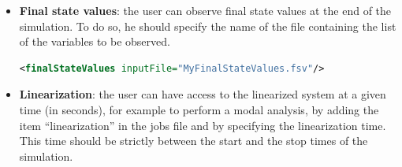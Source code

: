 \documentclass[a4paper, 12pt]{report}
\begin{document}
\begin{itemize}
HDF5 export requires \Dynawo to have been compiled with HDF5 support (CMake option \texttt{DYNAWO\_ACTIVATE\_HDF5\_EXPORT}, enabled by default).
If HDF5 support is not available and \texttt{exportMode="HDF5"} is requested, \Dynawo will raise an error at runtime.

Curves of every export mode, HDF5 included, are displayed in the NRT viewer by the \texttt{curves} command of 
(\texttt{curves-reference} compares them with the reference directory next to the jobs file):
\begin{lstlisting}[language=bash,numbers=none]
./envDynawo.sh curves path/to/simulation.jobs
\end{lstlisting}
Reading HDF5 curves requires the Python package \texttt{h5py}, listed with the other packages used by the viewer in :
\begin{lstlisting}[language=bash,numbers=none]
python -m pip install -r nrt/viewer/requirements.txt
\end{lstlisting}

\item \textbf{Final state values}: the user can observe final state values at the end of the simulation. To do so, he should specify the name of the file containing the list of the variables to be observed.

\begin{lstlisting}[language=XML, morekeywords={finalStateValues},numbers=none]
<finalStateValues inputFile="MyFinalStateValues.fsv"/>
\end{lstlisting}

\item \textbf{Linearization}: the user can have access to the linearized system at a given time (in seconds), for example to perform a modal analysis, by adding the item ``linearization'' in the jobs file and by specifying the linearization time. This time should be strictly between the start and the stop times of the simulation.


\end{itemize}
\end{document}

